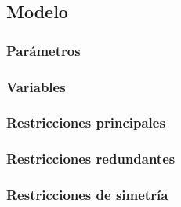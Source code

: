 
\subsection{Modelo}\label{sec:01-jobshop_mantenimiento-modelo}

\subsubsection*{Parámetros}

\subsubsection*{Variables}

\subsubsection*{Restricciones principales}

\subsubsection*{Restricciones redundantes}

\subsubsection*{Restricciones de simetría}